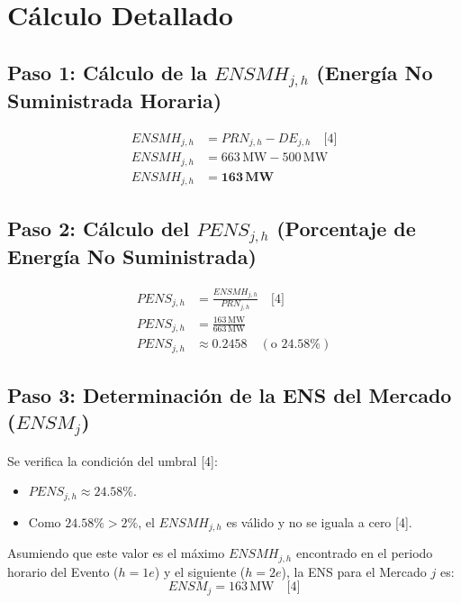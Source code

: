 \documentclass[a5paper]{book}%
\begin{document}
\section*{Cálculo Detallado}

\subsection*{Paso 1: Cálculo de la $ENSMH_{j,h}$ (Energía No Suministrada Horaria)}

\begin{align*}
	ENSMH_{j,h} &= PRN_{j,h} - DE_{j,h} \quad \text{[4]} \\
	ENSMH_{j,h} &= 663 \, \text{MW} - 500 \, \text{MW} \\
	ENSMH_{j,h} &= \mathbf{163 \, \text{MW}}
\end{align*}

\subsection*{Paso 2: Cálculo del $PENS_{j,h}$ (Porcentaje de Energía No Suministrada)}

\begin{align*}
	PENS_{j,h} &= \frac{ENSMH_{j,h}}{PRN_{j,h}} \quad \text{[4]} \\
	PENS_{j,h} &= \frac{163 \, \text{MW}}{663 \, \text{MW}} \\
	PENS_{j,h} &\approx 0.2458 \quad (\text{o } 24.58\%)
\end{align*}

\subsection*{Paso 3: Determinación de la ENS del Mercado ($ENSM_j$)}

Se verifica la condición del umbral [4]:
\begin{itemize}
	\item $PENS_{j,h} \approx 24.58\%$.
	\item Como $24.58\% > 2\%$, el $ENSMH_{j,h}$ es válido y no se iguala a cero [4].
\end{itemize}

Asumiendo que este valor es el máximo $ENSMH_{j,h}$ encontrado en el periodo horario del Evento ($h=1e$) y el siguiente ($h=2e$), la ENS para el Mercado $j$ es:
\begin{equation*}
	ENSM_j = 163 \, \text{MW} \quad \text{[4]}
\end{equation*}
\end{document}
